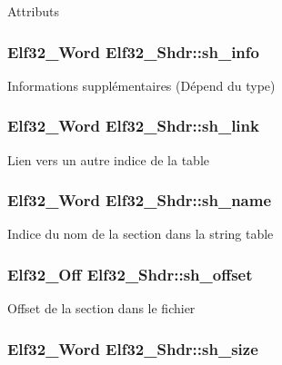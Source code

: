 Attributs \hypertarget{structElf32__Shdr_aef63fe62c2c9927f374c4f987954c6e5}{
\subsubsection[{sh\+\_\+info}]{\setlength{\rightskip}{0pt plus 5cm}Elf32\+\_\+\+Word Elf32\+\_\+\+Shdr\+::sh\+\_\+info}}\label{structElf32__Shdr_aef63fe62c2c9927f374c4f987954c6e5}
Informations supplémentaires (Dépend du type) \hypertarget{structElf32__Shdr_ad759308388eb14c5c6e4d636c38999da}{
\subsubsection[{sh\+\_\+link}]{\setlength{\rightskip}{0pt plus 5cm}Elf32\+\_\+\+Word Elf32\+\_\+\+Shdr\+::sh\+\_\+link}}\label{structElf32__Shdr_ad759308388eb14c5c6e4d636c38999da}
Lien vers un autre indice de la table \hypertarget{structElf32__Shdr_a6e8fd300ca473a31d0f65817ce371dfd}{
\subsubsection[{sh\+\_\+name}]{\setlength{\rightskip}{0pt plus 5cm}Elf32\+\_\+\+Word Elf32\+\_\+\+Shdr\+::sh\+\_\+name}}\label{structElf32__Shdr_a6e8fd300ca473a31d0f65817ce371dfd}
Indice du nom de la section dans la string table \hypertarget{structElf32__Shdr_a6e37227a5777cddc0a9dbbb3c2598ec1}{
\subsubsection[{sh\+\_\+offset}]{\setlength{\rightskip}{0pt plus 5cm}Elf32\+\_\+\+Off Elf32\+\_\+\+Shdr\+::sh\+\_\+offset}}\label{structElf32__Shdr_a6e37227a5777cddc0a9dbbb3c2598ec1}
Offset de la section dans le fichier \hypertarget{structElf32__Shdr_a84dc67bb0ab65880bbcd74fbee722ff1}{
\subsubsection[{sh\+\_\+size}]{\setlength{\rightskip}{0pt plus 5cm}Elf32\+\_\+\+Word Elf32\+\_\+\+Shdr\+::sh\+\_\+size}}\label{structElf32__Shdr_a84dc67bb0ab65880bbcd74fbee722ff1}
